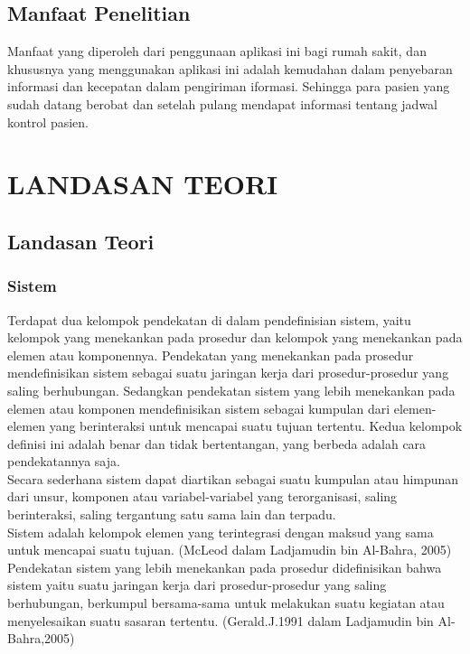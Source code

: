 \documentclass{jtetiproposalskripsi}
\begin{document}
\section{Manfaat Penelitian}
Manfaat yang diperoleh dari penggunaan aplikasi ini bagi rumah sakit, dan khususnya yang menggunakan aplikasi ini adalah kemudahan dalam penyebaran informasi dan kecepatan dalam pengiriman iformasi.
Sehingga para pasien yang sudah datang berobat dan setelah pulang mendapat informasi tentang jadwal kontrol pasien.


\chapter{LANDASAN TEORI}                

\section{Landasan Teori}
\subsection{Sistem}
Terdapat dua kelompok pendekatan di dalam pendefinisian sistem, yaitu kelompok yang menekankan pada prosedur dan kelompok yang menekankan pada elemen atau komponennya. Pendekatan yang menekankan pada prosedur mendefinisikan sistem sebagai suatu jaringan kerja dari prosedur-prosedur yang saling berhubungan. Sedangkan pendekatan sistem yang lebih menekankan pada elemen atau komponen mendefinisikan sistem sebagai kumpulan dari elemen-elemen yang berinteraksi untuk mencapai suatu tujuan tertentu. Kedua kelompok definisi ini adalah benar dan tidak bertentangan, yang berbeda adalah cara pendekatannya saja.
\\

Secara sederhana sistem dapat diartikan sebagai suatu kumpulan atau himpunan dari unsur, komponen atau variabel-variabel yang terorganisasi, saling berinteraksi, saling tergantung satu sama lain dan terpadu.
\\

Sistem adalah kelompok elemen yang terintegrasi dengan maksud yang sama untuk mencapai suatu tujuan. (McLeod dalam Ladjamudin bin Al-Bahra, 2005)
Pendekatan sistem yang lebih menekankan pada prosedur didefinisikan bahwa sistem yaitu suatu jaringan kerja dari prosedur-prosedur yang saling berhubungan, berkumpul bersama-sama untuk melakukan suatu kegiatan atau menyelesaikan suatu sasaran tertentu. (Gerald.J.1991 dalam Ladjamudin bin Al-Bahra,2005)
\\
\end{document}
